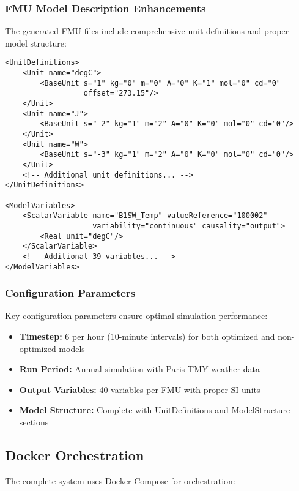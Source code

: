 \documentclass[12pt,a4paper]{article}
\begin{document}
\subsubsection{FMU Model Description Enhancements}

The generated FMU files include comprehensive unit definitions and proper model structure:

\begin{lstlisting}[style=xml, caption=FMU ModelDescription.xml Structure]
<UnitDefinitions>
    <Unit name="degC">
        <BaseUnit s="1" kg="0" m="0" A="0" K="1" mol="0" cd="0" 
                  offset="273.15"/>
    </Unit>
    <Unit name="J">
        <BaseUnit s="-2" kg="1" m="2" A="0" K="0" mol="0" cd="0"/>
    </Unit>
    <Unit name="W">
        <BaseUnit s="-3" kg="1" m="2" A="0" K="0" mol="0" cd="0"/>
    </Unit>
    <!-- Additional unit definitions... -->
</UnitDefinitions>

<ModelVariables>
    <ScalarVariable name="B1SW_Temp" valueReference="100002"
                    variability="continuous" causality="output">
        <Real unit="degC"/>
    </ScalarVariable>
    <!-- Additional 39 variables... -->
</ModelVariables>
\end{lstlisting}

\subsubsection{Configuration Parameters}

Key configuration parameters ensure optimal simulation performance:

\begin{itemize}
    \item \textbf{Timestep:} 6 per hour (10-minute intervals) for both optimized and non-optimized models
    \item \textbf{Run Period:} Annual simulation with Paris TMY weather data
    \item \textbf{Output Variables:} 40 variables per FMU with proper SI units
    \item \textbf{Model Structure:} Complete with UnitDefinitions and ModelStructure sections
\end{itemize}

\subsection{Docker Orchestration}

The complete system uses Docker Compose for orchestration:
\end{document}
